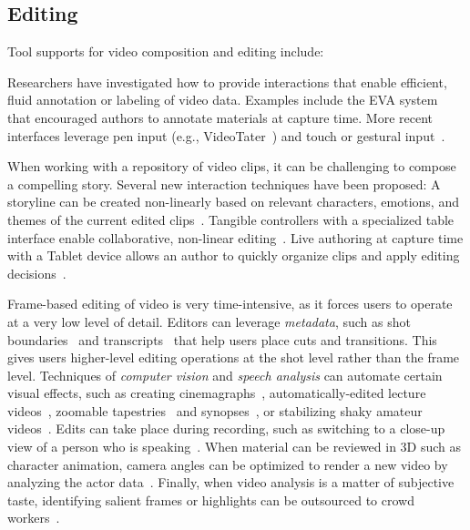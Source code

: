 
\subsection{Editing}
Tool supports for video composition and editing include:

Researchers have investigated how to provide interactions that enable efficient, fluid annotation or labeling of video data. Examples include the EVA system~\cite{Mackay:1989} that encouraged authors to annotate materials at capture time. More recent interfaces leverage pen input (e.g., VideoTater~\cite{Diakopoulos:2006vt}) and touch or gestural input~\cite{Sarkar:2016:SCC:2858036.2858199}.

When working with a repository of video clips, it can be challenging to compose a compelling story. Several new interaction techniques have been proposed:
%
A storyline can be created non-linearly based on relevant characters, emotions, and themes of the current edited clips~\cite{Shen:2009:WNE:1518701.1518825}.
%
Tangible controllers with a specialized table interface enable collaborative, non-linear editing~\cite{Bartindale:2012:STS:2207676.2207700,Bartindale:2016:TSS:2818048.2819929}.
%
Live authoring at capture time with a Tablet device allows an author to quickly organize clips and apply editing decisions~\cite{Freeman:2014:LLA:2611105.2557304}.

Frame-based editing of video is very time-intensive, as it forces users to operate at a very low level of detail. Editors can leverage \emph{metadata}, such as shot boundaries~\cite{Casares:2002dx} and transcripts~\cite{Berthouzoz:2012} that help users place cuts and transitions. This gives users higher-level editing operations at the shot level rather than the frame level.
%
Techniques of \emph{computer vision} and \emph{speech analysis} can automate certain visual effects, such as creating cinemagraphs~\cite{Bai:2012, Joshi:2012}, automatically-edited lecture videos~\cite{Heck:2007}, zoomable tapestries~\cite{Barnes:2010} and synopses~\cite{Pritch:2009vl}, or stabilizing shaky amateur videos~\cite{Liu:2011}.
%
Edits can take place during recording, such as switching to a close-up view of a person who is speaking~\cite{Ranjan:2010}.
%
When material can be reviewed in 3D such as character animation, camera angles can be optimized to render a new video by analyzing the actor data~\cite{assa2005action,assa2008motion}.
%
Finally, when video analysis is a matter of subjective taste, identifying salient frames or highlights can be outsourced to crowd workers~\cite{Bernstein:2011uj,Tang:2012:ECS:2207676.2208622}.

